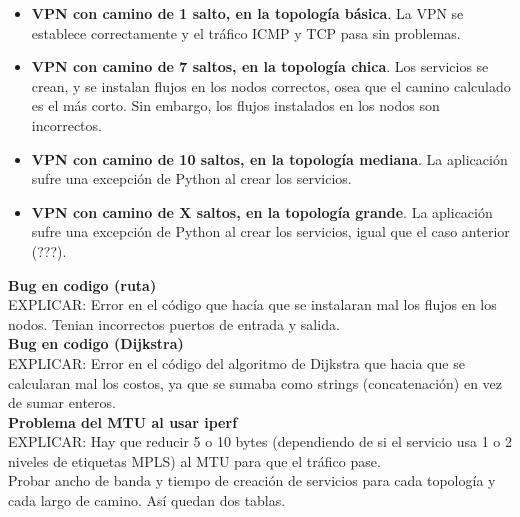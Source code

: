 \begin{itemize}
	\item \textbf{VPN con camino de 1 salto, en la topología básica}. La VPN se establece correctamente y el tráfico ICMP y TCP pasa sin problemas.
	\item \textbf{VPN con camino de 7 saltos, en la topología chica}. Los servicios se crean, y se instalan flujos en los nodos correctos, osea que el camino calculado es el más corto. Sin embargo, los flujos instalados en los nodos son incorrectos.
	\item \textbf{VPN con camino de 10 saltos, en la topología mediana}. La aplicación sufre una excepción de Python al crear los servicios.
	\item \textbf{VPN con camino de X saltos, en la topología grande}. La aplicación sufre una excepción de Python al crear los servicios, igual que el caso anterior (???).
\end{itemize}
\textbf{Bug en codigo (ruta)} \\
EXPLICAR: Error en el código que hacía que se instalaran mal los flujos en los nodos. Tenian incorrectos puertos de entrada y salida.\\
\textbf{Bug en codigo (Dijkstra)} \\
EXPLICAR: Error en el código del algoritmo de Dijkstra que hacia que se calcularan mal los costos, ya que se sumaba como strings (concatenación) en vez de sumar enteros. \\
\textbf{Problema del MTU al usar iperf} \\
EXPLICAR: Hay que reducir 5 o 10 bytes (dependiendo de si el servicio usa 1 o 2 niveles de etiquetas MPLS) al MTU para que el tráfico pase.\\




Probar ancho de banda y tiempo de creación de servicios para cada topología y cada largo de camino. Así quedan dos tablas.

